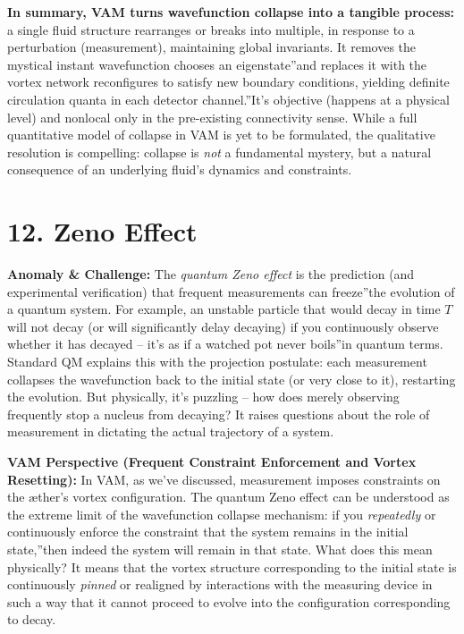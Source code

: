 \documentclass[a4paper, aps,preprint,superscriptaddress, 12pt]{revtex4}
\begin{document}
\textbf{In summary, VAM turns wavefunction collapse into a tangible process:} a single fluid structure rearranges or breaks into multiple, in response to a perturbation (measurement), maintaining global invariants. It removes the mystical instant \grqq wavefunction chooses an eigenstate\textquotedblright and replaces it with \grqq the vortex network reconfigures to satisfy new boundary conditions, yielding definite circulation quanta in each detector channel.\textquotedblright It's objective (happens at a physical level) and nonlocal only in the pre-existing connectivity sense. While a full quantitative model of collapse in VAM is yet to be formulated, the qualitative resolution is compelling: collapse is \textit{not} a fundamental mystery, but a natural consequence of an underlying fluid's dynamics and constraints.


\section*{12. Zeno Effect}

\textbf{Anomaly \& Challenge: } The \textit{quantum Zeno effect} is the prediction (and experimental verification) that frequent measurements can \grqq freeze\textquotedblright the evolution of a quantum system. For example, an unstable particle that would decay in time $T$ will not decay (or will significantly delay decaying) if you continuously observe whether it has decayed – it's as if \grqq a watched pot never boils\textquotedblright in quantum terms. Standard QM explains this with the projection postulate: each measurement collapses the wavefunction back to the initial state (or very close to it), restarting the evolution. But physically, it's puzzling – how does merely observing frequently stop a nucleus from decaying? It raises questions about the role of measurement in dictating the actual trajectory of a system.


\textbf{VAM Perspective (Frequent Constraint Enforcement and Vortex Resetting):} In VAM, as we've discussed, measurement imposes constraints on the æther's vortex configuration. The quantum Zeno effect can be understood as the extreme limit of the wavefunction collapse mechanism: if you \textit{repeatedly} or continuously enforce the constraint that \grqq the system remains in the initial state,\textquotedblright then indeed the system will remain in that state. What does this mean physically? It means that the vortex structure corresponding to the initial state is continuously \textit{pinned} or realigned by interactions with the measuring device in such a way that it cannot proceed to evolve into the configuration corresponding to decay.
\end{document}
